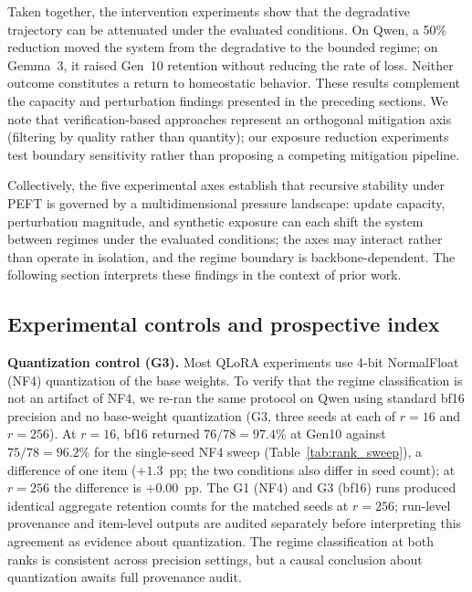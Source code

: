 \documentclass[a4paper,fleqn]{cas-dc}
\newif\ifshowchanges
\newcommand{\rev}[1]{\ifshowchanges{\color{blue}#1}\else{#1}\fi}
\begin{document}
Taken together, the intervention experiments show that the 
\rev{degradative trajectory can be attenuated under the evaluated 
conditions. On Qwen, a 50\% reduction moved the system from the degradative to the bounded regime; on Gemma~3, it raised Gen~10 retention without reducing the rate of loss. Neither outcome constitutes a return to homeostatic behavior.} These results complement the capacity and perturbation findings presented in the preceding sections. We note
that verification-based approaches \citep{yi2025} represent an orthogonal
mitigation axis (filtering by quality rather than quantity); our exposure
reduction experiments test boundary sensitivity rather than proposing a
competing mitigation pipeline.

Collectively, the five experimental axes establish that recursive stability
under PEFT is governed by a multidimensional pressure landscape: update
capacity, perturbation magnitude, and synthetic exposure \rev{can each shift} the system between regimes under the evaluated conditions; the axes may interact rather than operate in isolation, and the regime boundary is backbone-dependent. The following section
interprets these findings in the context of prior work.

\subsection{Experimental controls and prospective index}\label{sec:res_controls}

\rev{\textbf{Quantization control (G3).}
Most QLoRA experiments use 4-bit NormalFloat (NF4) quantization of the base
weights. To verify that the regime classification is not an artifact of NF4, we
re-ran the same protocol on Qwen using standard bf16 precision and no base-weight
quantization (G3, three seeds at each of $r=16$ and $r=256$). At $r=16$, bf16 returned $76/78 = 97.4\%$ at Gen10 against $75/78 = 96.2\%$ for
the single-seed NF4 sweep (Table~\ref{tab:rank_sweep}), a difference of one item ($+1.3$~pp; the two conditions also differ in seed count); at $r=256$ the difference is $+0.00$~pp.
The G1 (NF4) and G3 (bf16) runs produced identical aggregate retention counts
for the matched seeds at $r=256$; run-level provenance and item-level outputs
are audited separately before interpreting this agreement as evidence about
quantization. The regime classification at both ranks is consistent across
precision settings, but a causal conclusion about quantization awaits full
provenance audit.}
\end{document}
